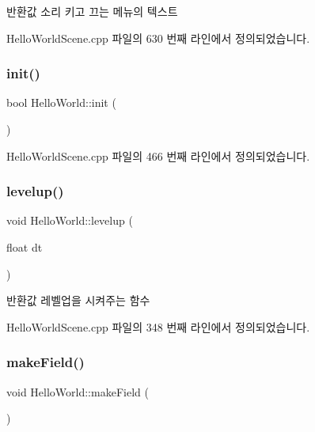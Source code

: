 \begin{DoxyReturn}{반환값}
소리 키고 끄는 메뉴의 텍스트 
\end{DoxyReturn}


Hello\+World\+Scene.\+cpp 파일의 630 번째 라인에서 정의되었습니다.

\mbox{\label{class_hello_world_a65e2b1525051f3690e5a39ca56608a97}} 
\subsubsection{\texorpdfstring{init()}{init()}}
{\footnotesize\ttfamily bool Hello\+World\+::init (\begin{DoxyParamCaption}{ }\end{DoxyParamCaption})\hspace{0.3cm}{\ttfamily [virtual]}}



Hello\+World\+Scene.\+cpp 파일의 466 번째 라인에서 정의되었습니다.

\mbox{\label{class_hello_world_af1590254503ba391a084d767df2dd858}} 
\subsubsection{\texorpdfstring{levelup()}{levelup()}}
{\footnotesize\ttfamily void Hello\+World\+::levelup (\begin{DoxyParamCaption}\item[{float}]{dt }\end{DoxyParamCaption})\hspace{0.3cm}{\ttfamily [protected]}}

\begin{DoxyReturn}{반환값}
레벨업을 시켜주는 함수 
\end{DoxyReturn}


Hello\+World\+Scene.\+cpp 파일의 348 번째 라인에서 정의되었습니다.

\mbox{\label{class_hello_world_ac7cca1564e8be641f0d52b97040c0a69}} 
\subsubsection{\texorpdfstring{make\+Field()}{makeField()}}
{\footnotesize\ttfamily void Hello\+World\+::make\+Field (\begin{DoxyParamCaption}{ }\end{DoxyParamCaption})\hspace{0.3cm}{\ttfamily [protected]}}

